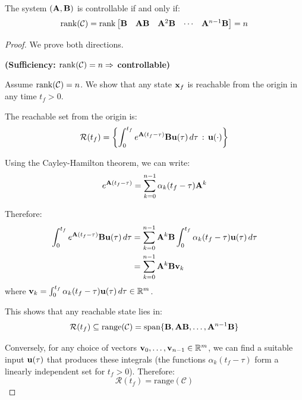 \begin{theorem}
\label{thm:rank_condition}
The system $(\mathbf{A}, \mathbf{B})$ is controllable if and only if:
\begin{equation}
\operatorname{rank}(\mathcal{C}) = \operatorname{rank}\begin{bmatrix} \mathbf{B} & \mathbf{A}\mathbf{B} & \mathbf{A}^2\mathbf{B} & \cdots & \mathbf{A}^{n-1}\mathbf{B} \end{bmatrix} = n
\label{eq:rank_condition}
\end{equation}
\end{theorem}

\begin{proof}
We prove both directions.

\textbf{(Sufficiency: $\operatorname{rank}(\mathcal{C}) = n \Rightarrow$ controllable)}

Assume $\operatorname{rank}(\mathcal{C}) = n$. We show that any state $\mathbf{x}_f$ is reachable from the origin in any time $t_f > 0$.

The reachable set from the origin is:
\begin{equation}
\mathcal{R}(t_f) = \left\{ \int_0^{t_f} e^{\mathbf{A}(t_f-\tau)}\mathbf{B}\mathbf{u}(\tau)\,d\tau \,:\, \mathbf{u}(\cdot) \right\}
\end{equation}

Using the Cayley-Hamilton theorem, we can write:
\begin{equation}
e^{\mathbf{A}(t_f-\tau)} = \sum_{k=0}^{n-1} \alpha_k(t_f-\tau)\mathbf{A}^k
\end{equation}

Therefore:
\begin{align}
\int_0^{t_f} e^{\mathbf{A}(t_f-\tau)}\mathbf{B}\mathbf{u}(\tau)\,d\tau &= \sum_{k=0}^{n-1} \mathbf{A}^k\mathbf{B} \int_0^{t_f} \alpha_k(t_f-\tau)\mathbf{u}(\tau)\,d\tau \\
&= \sum_{k=0}^{n-1} \mathbf{A}^k\mathbf{B} \mathbf{v}_k
\end{align}
where $\mathbf{v}_k = \int_0^{t_f} \alpha_k(t_f-\tau)\mathbf{u}(\tau)\,d\tau \in \mathbb{R}^m$.

This shows that any reachable state lies in:
\begin{equation}
\mathcal{R}(t_f) \subseteq \text{range}(\mathcal{C}) = \text{span}\{\mathbf{B}, \mathbf{A}\mathbf{B}, \ldots, \mathbf{A}^{n-1}\mathbf{B}\}
\end{equation}

Conversely, for any choice of vectors $\mathbf{v}_0, \ldots, \mathbf{v}_{n-1} \in \mathbb{R}^m$, we can find a suitable input $\mathbf{u}(\tau)$ that produces these integrals (the functions $\alpha_k(t_f-\tau)$ form a linearly independent set for $t_f > 0$). Therefore:
\begin{equation}
\mathcal{R}(t_f) = \text{range}(\mathcal{C})
\end{equation}


\end{proof}
